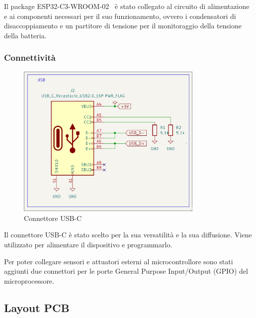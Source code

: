 Il package ESP32-C3-WROOM-02~\cite{esp32_c3_wroom_02_sheet} è stato collegato al circuito di alimentazione e ai componenti necessari per il suo funzionamento,
ovvero i condensatori di disaccoppiamento e un partitore di tensione per il monitoraggio della tensione della batteria.

\subsubsection{Connettività}

\begin{figure}[H]
  \centering
  \includegraphics[width=0.8\textwidth]{images/chapter2/usb.png}
  \caption{Connettore USB-C}
  \label{fig:usb}
\end{figure}
Il connettore USB-C è stato scelto per la sua versatilità e la sua diffusione. Viene utilizzato per alimentare il 
dispositivo e programmarlo.

Per poter collegare sensori e attuatori esterni al microcontrollore sono stati aggiunti due connettori 
per le porte General Purpose Input/Output (GPIO) del microprocessore.

\subsection{Layout PCB}


